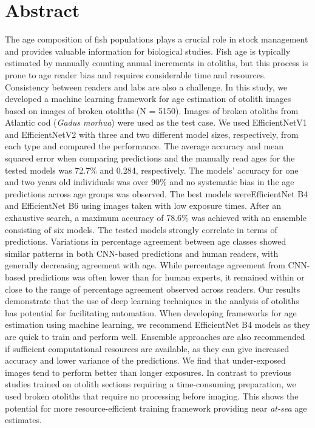 \documentclass[10pt,letterpaper]{article}
\begin{document}
\section{Abstract}
The age composition of fish populations plays a crucial role in stock management and provides valuable information for biological studies. Fish age is typically estimated by manually counting annual increments in otoliths, but  this process is prone to age reader bias and requires considerable time and resources. Consistency between readers and labs are also a challenge. In this study, we developed a machine learning framework for age estimation of otolith images based on images of broken otoliths (N = 5150). Images of broken otoliths from Atlantic cod (\textit{Gadus morhua}) were used as the test case. We used EfficientNetV1 and EfficientNetV2 with three and two different model sizes, respectively, from each type and compared the performance. The average accuracy and mean squared error when comparing predictions and the manually read ages  for the tested models was 72.7\% and 0.284, respectively. The models’ accuracy for one and two years old individuals was over 90\% and no systematic bias in the age predictions across age groups was observed. The  best models wereEfficientNet B4 and EfficientNet B6 using  images taken with low exposure times. After an exhaustive search, a maximum accuracy of 78.6\% was achieved with an ensemble consisting of six models. The tested models strongly correlate in terms of predictions. Variations in percentage agreement between age classes showed similar patterns in both CNN-based predictions and human readers, with generally decreasing agreement with age. While percentage agreement from CNN-based predictions was often lower than for human experts, it remained within or close to the range of percentage agreement observed across readers. Our results demonstrate that the use of deep learning techniques in the analysis of otoliths has potential for facilitating automation. When developing frameworks for age estimation using machine learning, we recommend EfficientNet B4 models as they are quick to train and perform well. Ensemble approaches are also recommended if sufficient computational resources are available, as they can give increased accuracy and lower variance of the predictions. We find that under-exposed images tend to perform better than longer exposures. In contrast to previous studies trained on otolith sections requiring a time-consuming preparation, we used broken otoliths that require no processing before imaging. This shows the potential for more resource-efficient training framework providing near \textit{at-sea} age estimates.
\end{document}
